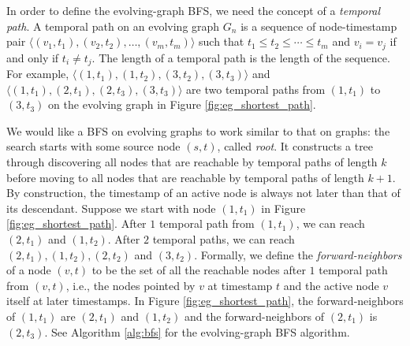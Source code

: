 \documentclass[11pt, conference, , compsocconf]{IEEEtran}
\theoremstyle{definition}
\begin{document}
In order to define the evolving-graph BFS, we need the concept of a 
\emph{temporal path}.
A temporal path on an evolving graph $G_n$ is a sequence of node-timestamp
pair $\langle (v_1, t_1), (v_2, t_2), \ldots, (v_m, t_m) \rangle$ such that 
$t_1 \leq t_2 \leq \cdots \leq t_m$ and $v_i = v_j$ if and only if 
$t_i \ne t_j$. The length of a temporal path is the length of the sequence.
For example, $\langle (1, t_1), (1, t_2), (3, t_2), (3, t_3) \rangle$ and 
$\langle (1, t_1), (2, t_1), (2, t_3), (3, t_3) \rangle$ 
are two temporal paths from $(1, t_1)$ to $(3, t_3)$
on the evolving graph in Figure \ref{fig:eg_shortest_path}. 

We would like a BFS on evolving graphs to work similar to that on graphs: the search starts with some source node $(s,t)$, called \emph{root}. It constructs a tree through discovering all nodes that are reachable by 
temporal paths of length $k$ before moving to all nodes that are reachable by 
 temporal paths of length $k+1$.
By construction, the timestamp of an active node is always not later than 
that of its descendant. Suppose we 
start with node $(1, t_1)$ in Figure \ref{fig:eg_shortest_path}. 
After $1$ temporal path from $(1, t_1)$, we can reach 
$(2, t_1)$ and $(1, t_2)$. After $2$ temporal paths, we can reach 
$(2, t_1), (1, t_2), (2, t_2)$ and $(3, t_2)$. 
Formally, we define the \emph{forward-neighbors} of a node $(v, t)$ to
be the set of all the reachable nodes after $1$ temporal path from
$(v, t)$, i.e., the nodes pointed by $v$ at timestamp $t$ and 
the active node $v$ itself at later timestamps. In Figure 
\ref{fig:eg_shortest_path}, 
the forward-neighbors of $(1, t_1)$  are $(2, t_1)$ and $(1, t_2)$ and 
the forward-neighbors of $(2, t_1)$ is $(2, t_3)$.
See Algorithm  \ref{alg:bfs} for the evolving-graph BFS algorithm.
\end{document}
